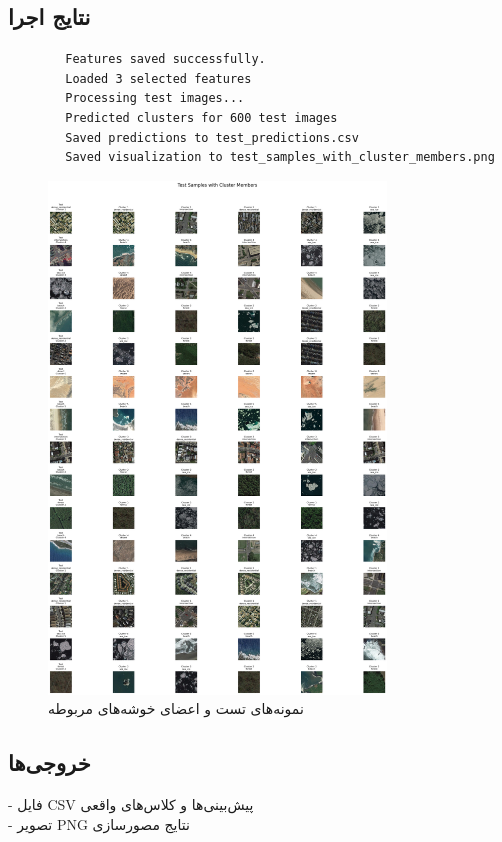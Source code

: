 \documentclass[a4paper,12pt]{article}
\begin{document}
	
	\subsection*{\textbf{نتایج اجرا}}
	\begin{latin}
		\begin{verbatim}
		Features saved successfully.
		Loaded 3 selected features
		Processing test images...
		Predicted clusters for 600 test images
		Saved predictions to test_predictions.csv
		Saved visualization to test_samples_with_cluster_members.png
		\end{verbatim}
	\end{latin}
		\begin{figure}[h]
		\centering
		\includegraphics[width=0.8\textwidth]{test_samples_with_cluster_members.png}
		\caption{نمونه‌های تست و اعضای خوشه‌های مربوطه}
	\end{figure}
	
	\subsection*{\textbf{خروجی‌ها}}
	- فایل CSV پیش‌بینی‌ها و کلاس‌های واقعی
	\\
	- تصویر PNG نتایج مصورسازی
\end{document}
